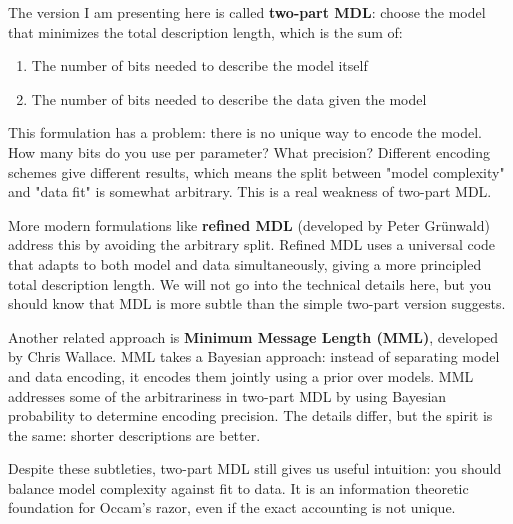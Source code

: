 The version I am presenting here is called \textbf{two-part MDL}: choose the model that minimizes the total description length, which is the sum of:

\begin{enumerate}
\item The number of bits needed to describe the model itself
\item The number of bits needed to describe the data given the model
\end{enumerate}

This formulation has a problem: there is no unique way to encode the model. How many bits do you use per parameter? What precision? Different encoding schemes give different results, which means the split between "model complexity" and "data fit" is somewhat arbitrary. This is a real weakness of two-part MDL.

More modern formulations like \textbf{refined MDL} (developed by Peter Grünwald) address this by avoiding the arbitrary split. Refined MDL uses a universal code that adapts to both model and data simultaneously, giving a more principled total description length. We will not go into the technical details here, but you should know that MDL is more subtle than the simple two-part version suggests.

Another related approach is \textbf{Minimum Message Length (MML)}, developed by Chris Wallace. MML takes a Bayesian approach: instead of separating model and data encoding, it encodes them jointly using a prior over models. MML addresses some of the arbitrariness in two-part MDL by using Bayesian probability to determine encoding precision. The details differ, but the spirit is the same: shorter descriptions are better.

Despite these subtleties, two-part MDL still gives us useful intuition: you should balance model complexity against fit to data. It is an information theoretic foundation for Occam's razor, even if the exact accounting is not unique.

\vspace{1.5em}

